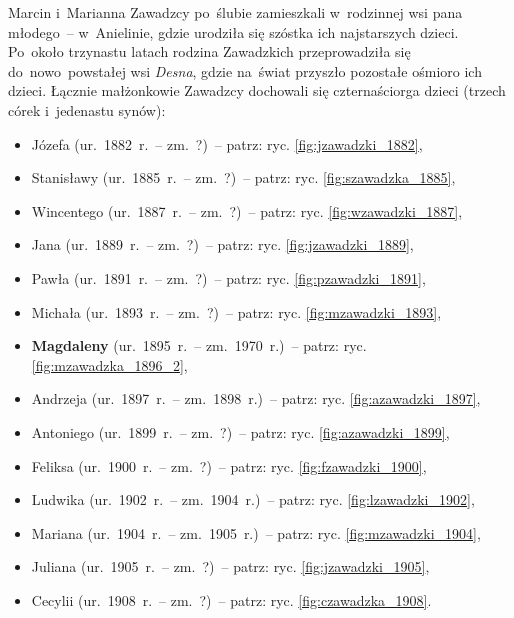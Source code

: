 Marcin
i~Marianna Zawadzcy
po~ślubie zamieszkali w~rodzinnej wsi pana młodego~-- w~Anielinie, gdzie
urodziła się szóstka ich najstarszych dzieci. Po~około trzynastu latach
rodzina Zawadzkich przeprowadziła się do~nowo~powstałej wsi \emph{Desna},
gdzie na~świat przyszło pozostałe ośmioro ich dzieci. Łącznie małżonkowie
Zawadzcy dochowali się czternaściorga dzieci (trzech córek i~jedenastu synów): 

\begin{itemize}
\item Józefa
(ur.~1882~r.~-- zm.~?)~-- patrz: ryc. \ref{fig:jzawadzki_1882},
\item Stanisławy
(ur.~1885~r.~-- zm.~?)~-- patrz: ryc. \ref{fig:szawadzka_1885},
\item Wincentego
(ur.~1887~r.~-- zm.~?)~-- patrz: ryc. \ref{fig:wzawadzki_1887},
\item Jana
(ur.~1889~r.~-- zm.~?)~-- patrz: ryc. \ref{fig:jzawadzki_1889},
\item Pawła
(ur.~1891~r.~-- zm.~?)~-- patrz: ryc. \ref{fig:pzawadzki_1891},
\item Michała
(ur.~1893~r.~-- zm.~?)~-- patrz: ryc. \ref{fig:mzawadzki_1893},
\item \textbf{Magdaleny}
(ur.~1895~r.~-- zm.~1970~r.)~-- patrz: ryc. \ref{fig:mzawadzka_1896_2},
\item Andrzeja
(ur.~1897~r.~-- zm.~1898~r.)~-- patrz: ryc. \ref{fig:azawadzki_1897},
\item Antoniego
(ur.~1899~r.~-- zm.~?)~-- patrz: ryc. \ref{fig:azawadzki_1899},
\item Feliksa
(ur.~1900~r.~-- zm.~?)~-- patrz: ryc. \ref{fig:fzawadzki_1900},
\item Ludwika
(ur.~1902~r.~-- zm.~1904~r.)~-- patrz: ryc. \ref{fig:lzawadzki_1902},
\item Mariana
(ur.~1904~r.~-- zm.~1905~r.)~-- patrz: ryc. \ref{fig:mzawadzki_1904},
\item Juliana
(ur.~1905~r.~-- zm.~?)~-- patrz: ryc. \ref{fig:jzawadzki_1905},
\item Cecylii
(ur.~1908~r.~-- zm.~?)~-- patrz: ryc. \ref{fig:czawadzka_1908}.
\end{itemize}

